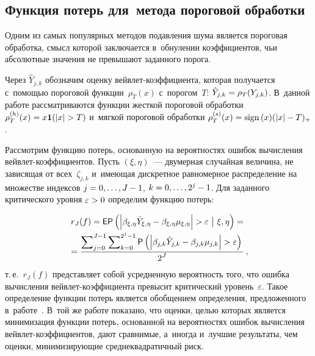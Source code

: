 \begin{multicols}{2}
\section{Функция потерь для~метода пороговой обработки}

Одним из самых популярных методов подавления шума является пороговая обработка, 
смысл которой заключается в~обнулении коэффициентов, чьи абсолютные значения 
не превышают заданного порога.

Через $\hat{Y}_{j,k}$ обозначим оценку вейв\-лет-ко\-эф\-фи\-ци\-ен\-та, которая 
получается 
с~по\-мощью пороговой функции~$\rho_T(x)$ с~порогом~$T$: 
$\hat{Y}_{j,k}\hm=\rho_T(Y_{j,k})$. В~данной работе рас\-смат\-ри\-ва\-ют\-ся функции 
жесткой пороговой обработки $\rho_T^{(h)}(x)\hm=x \mathbf{1} (|x|\hm>T)$ 
и~мягкой пороговой обработки $\rho_T^{(s)}(x)\hm=\mathrm{sign}\,(x)(|x|\hm-T)_+$.

Рассмотрим функцию потерь, основанную на вероятностях ошибок 
вы\-чис\-ле\-ния вейв\-лет-ко\-эф\-фи\-ци\-ен\-тов. Пусть $(\xi,\eta)$~--- 
двумерная случайная величина, не зависящая от всех~$\zeta_{j,k}$ и~име\-ющая 
дискретное равномерное распределение на множестве индексов 
$j\hm=0,\ldots,J-1$, $k\hm=0,\ldots,2^j-1$. Для заданного критического
 уровня  $\varepsilon\hm>0$ определим функцию потерь:
 
 \noindent
\begin{multline*}
r_J(f)={\sf E}{\sf P}\left(\left|\beta_{\xi,\eta}\hat{Y}_{\xi,\eta}-
\beta_{\xi,\eta}\mu_{\xi,\eta}\right|>\varepsilon\ \big|\ \xi,\eta\right)={}\\[-1pt]
{}=\fr{\sum\nolimits_{j=0}^{J-1}\sum\nolimits_{k=0}^{2^j-1} 
{\sf P}\left(\abs{\betajk\hat{Y}_{j,k}-\betajk\mujk}>\varepsilon\right)}{2^J}\,,
\end{multline*}
т.\,е.~$r_J(f)$ представляет собой усредненную вероятность того, что ошибка 
вычисления вейв\-лет-ко\-эф\-фи\-ци\-ен\-та превысит критический уровень~$\varepsilon$. 
Такое определение функции потерь является обобщением определения, 
предложенного в~работе~\cite{SMS14}. В~той же работе показано, что оценки, 
целью которых является минимизация функции потерь, основанной на вероятностях 
ошибок вычисления вейв\-лет-ко\-эф\-фи\-ци\-ен\-тов, дают срав\-ни\-мые, а~иногда и~лучшие 
результаты, чем оценки, минимизирующие сред\-не\-квад\-ра\-тич\-ный риск.


\end{multicols}
